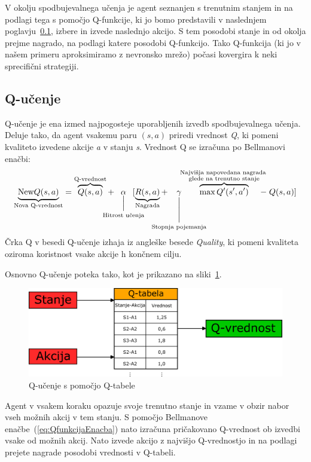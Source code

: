 \documentclass[cover]{thesis}
\begin{document}
V okolju spodbujevalnega učenja je agent seznanjen s trenutnim stanjem in na podlagi tega s pomočjo Q-funkcije, ki jo bomo predstavili v naslednjem poglavju~\ref{section:qlearning}, izbere in izvede naslednjo akcijo. S tem posodobi stanje in od okolja prejme nagrado, na podlagi katere posodobi Q-funkcijo. Tako Q-funkcija (ki jo v našem primeru aproksimiramo z nevronsko mrežo) počasi kovergira k neki sprecifični strategiji.

\subsection{Q-učenje}\label{section:qlearning}

Q-učenje je ena izmed najpogosteje uporabljenih izvedb spodbujevalnega učenja. Deluje tako, da agent vsakemu paru $(s,a)$ priredi vrednost \emph{Q}, ki 
pomeni kvaliteto izvedene akcije \emph{a} v stanju \emph{s}. Vrednost Q se izračuna po Bellmanovi enačbi:
\begin{equation}\label{eq:QfunkcijaEnacba}
    \underbrace{\text{New}Q(s,a)}_{\scriptstyle\text{Nova Q-vrednost}} =
    \overbrace{Q(s,a)}^{\scriptstyle\text{Q-vrednost}} +
    \mkern-25mu\underset{\text{Hitrost učenja}}{\underset{\Bigl|}{\alpha}}
    \mkern-25mu[\underbrace{R(s,a)}_{\scriptstyle\text{Nagrada}} +
    \mkern-35mu\underset{\text{Stopnja pojemanja}}{\underset{\Biggl|}{\gamma}}
    \mkern-60mu\overbrace{\max Q'(s',a')}^{\scriptstyle\substack{\text{Najvišja napovedana nagrada } \\ \text{glede na trenutno stanje}}}
    \mkern-20mu - 
    \mkern5mu Q(s,a)]
\end{equation}
Črka Q v besedi Q-učenje izhaja iz angleške besede \emph{Quality}, ki pomeni kvaliteta oziroma koristnost vsake akcije h končnem cilju. 

Osnovno Q-učenje poteka tako, kot je prikazano na sliki~\ref{fig:qtable}.
\begin{figure}[H]
    \includegraphics[width=\textwidth]{qtable.png}
    \caption{Q-učenje s pomočjo Q-tabele}\label{fig:qtable}
\end{figure}
Agent v vsakem koraku opazuje svoje trenutno stanje in vzame v obzir nabor vseh možnih akcij v tem stanju. S pomočjo Bellmanove enačbe~(\ref{eq:QfunkcijaEnacba}) nato izračuna pričakovano Q-vrednost ob izvedbi vsake od možnih akcij. Nato izvede akcijo z najvišjo Q-vrednostjo in na podlagi prejete nagrade posodobi vrednosti v Q-tabeli.
\end{document}
